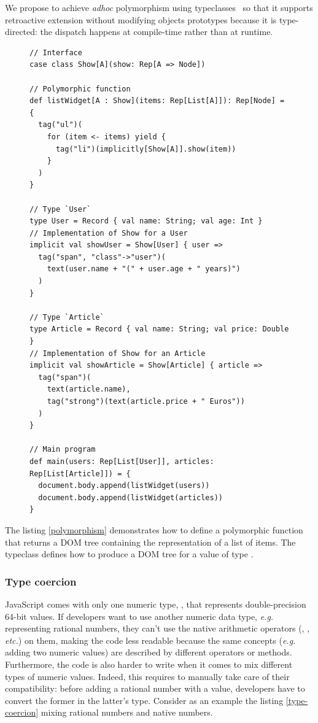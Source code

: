 \documentclass[american,english,runningheads]{llncs}
\newcommand{\eg}{\emph{e.g.}}
\newcommand{\etc}{\emph{etc.}}
\begin{document}
We propose to achieve \emph{adhoc} polymorphism using
typeclasses~\cite{Wadler89_AdhocPolymorphism,Odersky06_Typeclasses,Oliveira10_Typeclasses} so that it supports
retroactive extension without modifying objects prototypes because it is type-directed: the dispatch happens at
compile-time rather than at runtime.

\begin{figure}
\begin{lstlisting}[label=polymorphism,caption=Adhoc polymorphism using typeclasses]
// Interface
case class Show[A](show: Rep[A => Node])

// Polymorphic function
def listWidget[A : Show](items: Rep[List[A]]): Rep[Node] = {
  tag("ul")(
    for (item <- items) yield {
      tag("li")(implicitly[Show[A]].show(item))
    }
  )
}

// Type `User`
type User = Record { val name: String; val age: Int }
// Implementation of Show for a User
implicit val showUser = Show[User] { user =>
  tag("span", "class"->"user")(
    text(user.name + "(" + user.age + " years)")
  )
}

// Type `Article`
type Article = Record { val name: String; val price: Double }
// Implementation of Show for an Article
implicit val showArticle = Show[Article] { article =>
  tag("span")(
    text(article.name),
    tag("strong")(text(article.price + " Euros"))
  )
}

// Main program
def main(users: Rep[List[User]], articles: Rep[List[Article]]) = {
  document.body.append(listWidget(users))
  document.body.append(listWidget(articles))
}
\end{lstlisting}
\end{figure}

The listing \ref{polymorphism} demonstrates how to define a polymorphic  function that returns a DOM
tree containing the representation of a list of items. The  typeclass defines how to produce a DOM tree
for a value of type .

\subsubsection{Type coercion}

JavaScript comes with only one numeric type, , that represents double-precision 64-bit values. If
developers want to use another numeric data type, \eg{} representing rational numbers, they can’t use the native
arithmetic operators (\code{+}, \code{-}, \etc) on them, making the code less readable because the same concepts
(\eg{} adding two numeric values) are described by different operators or methods. Furthermore, the code is also
harder to write when it comes to mix different types of numeric values. Indeed, this requires to manually take care
of their compatibility: before adding a rational number with a  value, developers have to convert the
former in the latter’s type. Consider as an example the listing \ref{type-coercion} mixing rational numbers and
native numbers.
\end{document}
